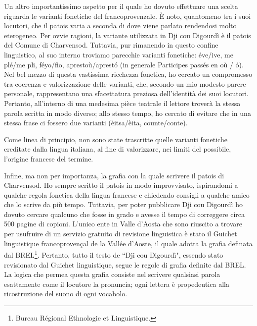 Un altro importantissimo aspetto per il quale ho dovuto effettuare una scelta riguarda le varianti fonetiche del francoprovenzale. È noto, quantomeno tra i suoi locutori, che il patois varia a seconda di dove viene parlato rendendosi molto eterogeneo. Per ovvie ragioni, la variante utilizzata in Dji cou Digourdì è il patois del Comune di Charvensod. Tuttavia, pur rimanendo in questo confine linguistico, al suo interno troviamo parecchie varianti fonetiche: éve/ive, me plé/me pli, féyo/fio, aprestoù/aprestó (in generale Participes passés en où / ó). Nel bel mezzo di questa vastissima ricchezza fonetica, ho cercato un compromesso tra coerenza e valorizzazione delle varianti, che, secondo un mio modesto parere personale, rappresentano una sfacettatura preziosa dell'identità dei suoi locutori. Pertanto, all'interno di una medesima pièce teatrale il lettore troverà la stessa parola scritta in modo diverso; allo stesso tempo, ho cercato di evitare che in una stessa frase ci fossero due varianti (èitsa/èita, counte/conte).

Come linea di principio, non sono state trascritte quelle varianti fonetiche ereditate dalla lingua italiana, al fine di valorizzare, nei limiti del possibile, l'origine francese del termine. %



Infine, ma non per importanza, la grafia con la quale scrivere il patois di Charvensod. Ho sempre scritto il patois in modo improvvisato, ispirandomi a qualche regola fonetica della lingua francese e chiedendo consigli a qualche amico che lo scrive da più tempo. Tuttavia, per poter pubblicare Dji cou Digourdì ho dovuto cercare qualcuno che fosse in grado e avesse il tempo di correggere circa 500 pagine di copioni. L'unico ente in Valle d'Aosta che sono riuscito a trovare per usufruire di un servizio gratuito di revisione linguistica è stato il Guichet linguistique francoprovençal de la Vallée d'Aoste, il quale adotta la grafia definata dal BREL\footnote{ Bureau Régional Ethnologie et Linguistique.}. Pertanto, tutto il testo de ``Dji cou Digourdì", essendo stato revisionato dal Guichet linguistique, segue le regole di grafia definite dal BREL. La logica che permea questa grafia consiste nel scrivere qualsiasi parola esattamente come il locutore la pronuncia; ogni lettera è propedeutica alla ricostruzione del suono di ogni vocabolo.

